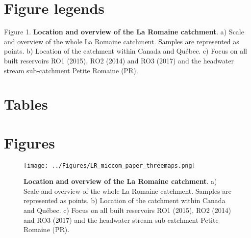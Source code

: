 \documentclass[12pt,a4paper]{article} %
\begin{document}


\newpage
\section*{Figure legends}
Figure 1. \textbf{Location and overview of the La Romaine catchment}. a) Scale and overview of the whole La Romaine catchment. Samples are represented as points. b) Location of the catchment within Canada and Québec. c) Focus on all built reservoirs RO1 (2015), RO2 (2014) and RO3 (2017) and the headwater stream sub-catchment Petite Romaine (PR).

\section*{Tables}

\section*{Figures}
\begin{figure}[!ht]
\centering
\texttt{[image: ../Figures/LR\_miccom\_paper\_threemaps.png]}
\caption{\textbf{Location and overview of the La Romaine catchment}. a) Scale and overview of the whole La Romaine catchment. Samples are represented as points. b) Location of the catchment within Canada and Québec. c) Focus on all built reservoirs RO1 (2015), RO2 (2014) and RO3 (2017) and the headwater stream sub-catchment Petite Romaine (PR).}
\end{figure}
\end{document}
